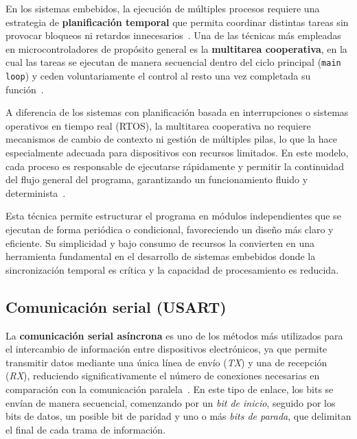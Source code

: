 En los sistemas embebidos, la ejecución de múltiples procesos requiere una estrategia de \textbf{planificación temporal} que permita coordinar distintas tareas sin provocar bloqueos ni retardos innecesarios~\cite{mazidi_avr_2014}. Una de las técnicas más empleadas en microcontroladores de propósito general es la \textbf{multitarea cooperativa}, en la cual las tareas se ejecutan de manera secuencial dentro del ciclo principal (\texttt{main loop}) y ceden voluntariamente el control al resto una vez completada su función~\cite{labrosse_embedded_2013}.

\vspace{1em}

A diferencia de los sistemas con planificación basada en interrupciones o sistemas operativos en tiempo real (RTOS), la multitarea cooperativa no requiere mecanismos de cambio de contexto ni gestión de múltiples pilas, lo que la hace especialmente adecuada para dispositivos con recursos limitados. En este modelo, cada proceso es responsable de ejecutarse rápidamente y permitir la continuidad del flujo general del programa, garantizando un funcionamiento fluido y determinista~\cite{williams_make_avr_2014}.

\vspace{1em}

Esta técnica permite estructurar el programa en módulos independientes que se ejecutan de forma periódica o condicional, favoreciendo un diseño más claro y eficiente. Su simplicidad y bajo consumo de recursos la convierten en una herramienta fundamental en el desarrollo de sistemas embebidos donde la sincronización temporal es crítica y la capacidad de procesamiento es reducida.


\subsection{Comunicación serial (USART)}

    La \textbf{comunicación serial asíncrona} es uno de los métodos más utilizados para el intercambio de información entre dispositivos electrónicos, ya que permite transmitir datos mediante una única línea de envío (\textit{TX}) y una de recepción (\textit{RX}), reduciendo significativamente el número de conexiones necesarias en comparación con la comunicación paralela~\cite{mazidi_avr_2014}.  
    En este tipo de enlace, los bits se envían de manera secuencial, comenzando por un \textit{bit de inicio}, seguido por los bits de datos, un posible bit de paridad y uno o más \textit{bits de parada}, que delimitan el final de cada trama de información.

